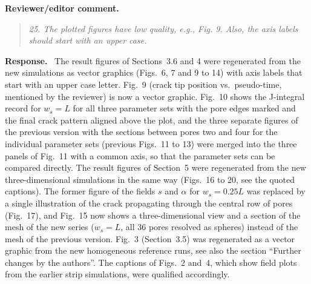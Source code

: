 \documentclass[pdflatex,sn-mathphys-num]{sn-jnl}
\newenvironment{reviewercomment}
  {\par\noindent\textbf{Reviewer/editor comment.}\begin{quote}\itshape}
  {\end{quote}}
\newenvironment{response}
  {\par\noindent\textbf{Response.}\ }
  {\par}
\begin{document}
\begin{reviewercomment}
25. The plotted figures have low quality, e.g., Fig. 9. Also, the axis labels should start with an upper case.
\end{reviewercomment}
\begin{response}
The result figures of Sections~3.6 and 4 were regenerated from the new simulations as vector graphics (Figs.~6, 7 and 9 to 14) with axis labels that start with an upper case letter. Fig.~9 (crack tip position vs.\ pseudo-time, mentioned by the reviewer) is now a vector graphic. Fig.~10 shows the J-integral record for $w_s = L$ for all three parameter sets with the pore edges marked and the final crack pattern aligned above the plot, and the three separate figures of the previous version with the sections between pores two and four for the individual parameter sets (previous Figs.~11 to 13) were merged into the three panels of Fig.~11 with a common axis, so that the parameter sets can be compared directly. The result figures of Section~5 were regenerated from the new three-dimensional simulations in the same way (Figs.~16 to 20, see the quoted captions). The former figure of the fields $s$ and $\alpha$ for $w_s = 0.25L$ was replaced by a single illustration of the crack propagating through the central row of pores (Fig.~17), and Fig.~15 now shows a three-dimensional view and a section of the mesh of the new series ($w_s = L$, all 36 pores resolved as spheres) instead of the mesh of the previous version. Fig.~3 (Section~3.5) was regenerated as a vector graphic from the new homogeneous reference runs, see also the section ``Further changes by the authors''. The captions of Figs.~2 and~4, which show field plots from the earlier strip simulations, were qualified accordingly.
\end{response}
\end{document}
